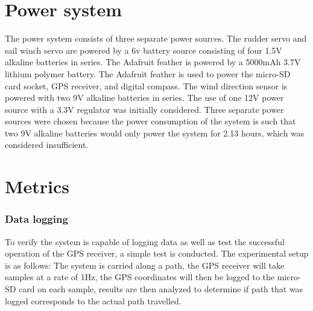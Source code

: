\section{Power system}
The power system consists of three separate power sources. The rudder servo and sail winch servo are powered by a 6v battery source consisting of four 1.5V
alkaline batteries in series. The Adafruit feather is powered by a 5000mAh 3.7V lithium polymer battery. The Adafruit feather is used to power the micro-SD 
card socket, GPS receiver, and digital compass. The wind direction sensor is powered with two 9V alkaline batteries in series. The use of one 12V power source 
with a 3.3V regulator was initially considered. Three separate power sources were chosen because the power consumption of the system is such that two 9V alkaline
batteries would only power the system for 2.13 hours, which was considered insufficient.

\section{Metrics}



\subsubsection{Data logging}
To verify the system is capable of logging data as well as test the successful operation of the GPS receiver, a simple test is conducted. The experimental 
setup is as follows: The system is carried along a path, the GPS receiver will take samples at a rate of 1Hz, the GPS coordinates will then be logged to 
the micro-SD card on each sample, results are then analyzed to determine if path that was logged corresponds to the actual path travelled. 

